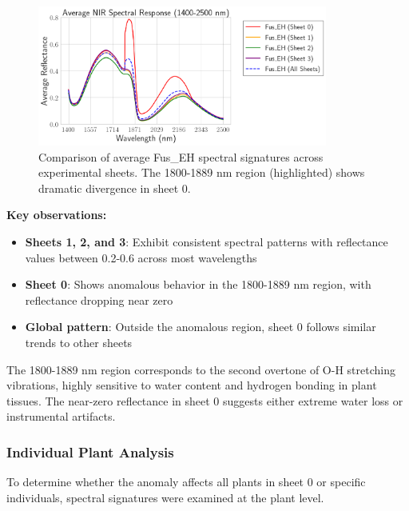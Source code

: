 \documentclass[12pt,a4paper]{article}
\begin{document}
\begin{figure}[H]
    \centering
    \includegraphics[width=0.85\textwidth]{Plots/FusEH_Sheet_Comparison.png}
    \caption{Comparison of average Fus\_EH spectral signatures across experimental sheets. The 1800-1889 nm region (highlighted) shows dramatic divergence in sheet 0.}
    \label{fig:fus_eh_comparison}
\end{figure}

\textbf{Key observations:}
\begin{itemize}
    \item \textbf{Sheets 1, 2, and 3}: Exhibit consistent spectral patterns with reflectance values between 0.2-0.6 across most wavelengths
    \item \textbf{Sheet 0}: Shows anomalous behavior in the 1800-1889 nm region, with reflectance dropping near zero
    \item \textbf{Global pattern}: Outside the anomalous region, sheet 0 follows similar trends to other sheets
\end{itemize}

The 1800-1889 nm region corresponds to the second overtone of O-H stretching vibrations, highly sensitive to water content and hydrogen bonding in plant tissues. The near-zero reflectance in sheet 0 suggests either extreme water loss or instrumental artifacts.

\subsubsection{Individual Plant Analysis}

To determine whether the anomaly affects all plants in sheet 0 or specific individuals, spectral signatures were examined at the plant level.
\end{document}

